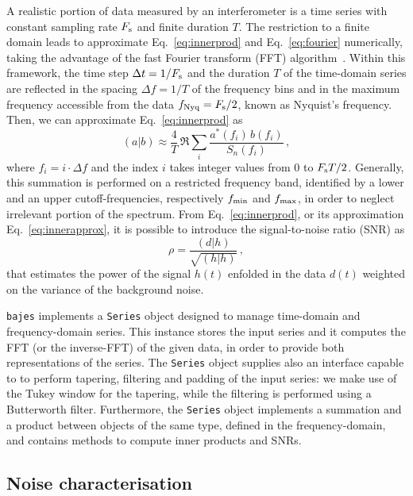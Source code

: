 \documentclass[prd,aps,twocolumn,a4paper,showkeys,nofootinbib,floatfix]{revtex4-1}
\newcommand{\be}{\begin{equation}}
\newcommand{\ee}{\end{equation}}
\def\srate{F_{\rm s}}
\def\fNyq{f_{\rm Nyq}}
\def\fmin{f_{\rm min}}
\def\fmax{f_{\rm max}}
\newcommand{\bajes}{{\tt bajes}}
\begin{document}
A realistic portion of data measured by an interferometer is 
a time series with constant sampling rate $\srate$ and finite duration $T$.
The restriction to a finite domain leads to approximate 
Eq.~\eqref{eq:innerprod} and Eq.~\eqref{eq:fourier} numerically, 
taking the advantage of the fast Fourier transform (FFT) algorithm~\cite{FFT}. 
Within this framework, the time step $\Delta t = 1/\srate$ and the duration $T$ of the
time-domain series are reflected in the spacing $\Delta f =1/T$ 
of the frequency bins and in the maximum frequency accessible from the data $\fNyq = \srate/2$,
known as Nyquist's frequency.
Then, we can approximate Eq.~\eqref{eq:innerprod} as
 \be
\label{eq:innerapprox}
(a|b) \approx \frac{4}{T} \,\Re \sum_{i} \frac{a^*(f_i)\,b(f_i)}{S_n(f_i)}\,,
\ee
where $f_i = i \cdot\Delta f $ and the index $i$ takes integer values from 0 to $\srate T/2$.
Generally, this summation is performed on a restricted frequency band,
identified by a lower and an upper cutoff-frequencies, respectively $\fmin$ and $\fmax$,
in order to neglect irrelevant portion of the spectrum. 
From Eq.~\eqref{eq:innerprod}, 
or its approximation Eq.~\eqref{eq:innerapprox},
it is possible to introduce the signal-to-noise ratio (SNR) as
\be
\rho = \frac{(d|h)}{\sqrt{(h|h)}}\,,
\ee
that estimates the power of the signal $h(t)$ enfolded in the data $d(t)$
weighted on the variance of the background noise.

{\bajes} implements a {\tt Series} object
 designed to manage time-domain and frequency-domain series.
 This instance stores the input series and it 
 computes the FFT (or the inverse-FFT)
 of the given data, in order to provide both 
 representations of the series.
 The {\tt Series} object supplies also an interface 
 capable to to perform tapering, filtering and padding of the input series:
we make use of the Tukey window for the tapering,
 while the filtering is performed using a Butterworth filter.
 Furthermore, the {\tt Series} object implements a summation 
 and a product between objects of the same type, defined in the frequency-domain,
 and contains methods to compute inner products and SNRs.

\subsection{Noise characterisation} 
\label{sec:noise}
\end{document}
